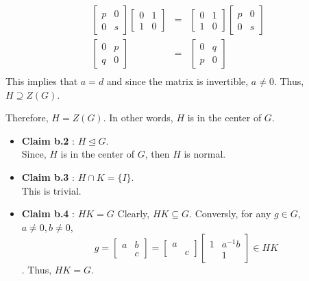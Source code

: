 \documentclass[
]{book}
\theoremstyle{definition}
\theoremstyle{definition}
\theoremstyle{definition}
\theoremstyle{definition}
\theoremstyle{remark}
\begin{document}
\begin{eqnarray}
\begin{bmatrix}
p & 0 \\
0 & s
\end{bmatrix}\begin{bmatrix}
0 & 1 \\
1 & 0
\end{bmatrix} &=& \begin{bmatrix}
0 & 1 \\
1 & 0
\end{bmatrix}\begin{bmatrix}
p & 0 \\
0 & s
\end{bmatrix}\\
\begin{bmatrix}
0 & p \\
q & 0
\end{bmatrix}&=& \begin{bmatrix}
0 & q \\
p & 0
\end{bmatrix}\\
\end{eqnarray}
This implies that \(a = d\) and since the matrix is invertible, \(a\neq 0\). Thus, \(H \supseteq Z(G)\).

Therefore, \(H = Z(G)\). In other words, \(H\) is in the center of \(G\).

\begin{itemize}
\item
  \textbf{Claim b.2} : \(H\trianglelefteq G\).\\
  Since, \(H\) is in the center of \(G\), then \(H\) is normal.
\item
  \textbf{Claim b.3} : \(H\cap K=\{I\}\).\\
  This is trivial.
\item
  \textbf{Claim b.4} : \(HK=G\)
  Clearly, \(HK\subseteq G\). Conversly,
  for any \(g\in G\), \(a\neq 0, b\neq 0\),
  \[g=\begin{bmatrix}
  a & b \\
  & c
  \end{bmatrix}=\begin{bmatrix}
  a &  \\
  & c
  \end{bmatrix}\begin{bmatrix}
  1 & a^{-1}b \\
  & 1
  \end{bmatrix}\in HK\].
  Thus, \(HK=G\).
\end{itemize}
\end{document}
